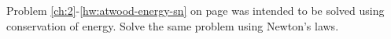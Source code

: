 Problem \ref{ch:2}-\ref{hw:atwood-energy-sn} on page \pageref{hw:atwood-energy-sn} was intended to be solved using conservation
of energy. Solve the same problem using Newton's laws.

